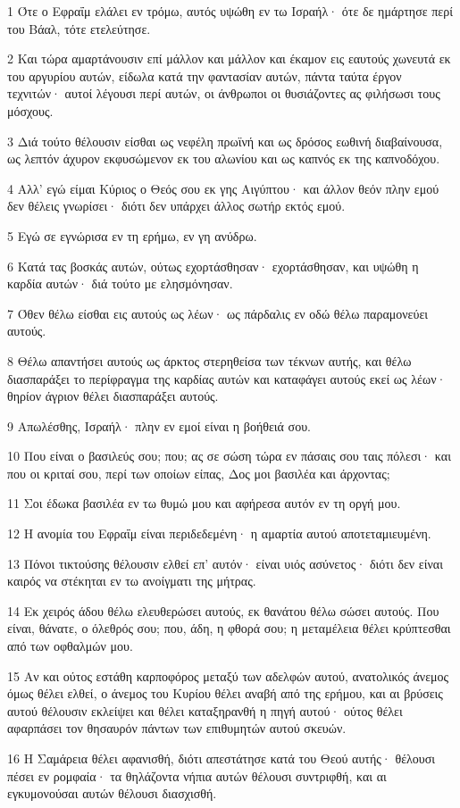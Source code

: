 \par 1 Ότε ο Εφραΐμ ελάλει εν τρόμω, αυτός υψώθη εν τω Ισραήλ· ότε δε ημάρτησε περί του Βάαλ, τότε ετελεύτησε.
\par 2 Και τώρα αμαρτάνουσιν επί μάλλον και μάλλον και έκαμον εις εαυτούς χωνευτά εκ του αργυρίου αυτών, είδωλα κατά την φαντασίαν αυτών, πάντα ταύτα έργον τεχνιτών· αυτοί λέγουσι περί αυτών, οι άνθρωποι οι θυσιάζοντες ας φιλήσωσι τους μόσχους.
\par 3 Διά τούτο θέλουσιν είσθαι ως νεφέλη πρωϊνή και ως δρόσος εωθινή διαβαίνουσα, ως λεπτόν άχυρον εκφυσώμενον εκ του αλωνίου και ως καπνός εκ της καπνοδόχου.
\par 4 Αλλ' εγώ είμαι Κύριος ο Θεός σου εκ γης Αιγύπτου· και άλλον θεόν πλην εμού δεν θέλεις γνωρίσει· διότι δεν υπάρχει άλλος σωτήρ εκτός εμού.
\par 5 Εγώ σε εγνώρισα εν τη ερήμω, εν γη ανύδρω.
\par 6 Κατά τας βοσκάς αυτών, ούτως εχορτάσθησαν· εχορτάσθησαν, και υψώθη η καρδία αυτών· διά τούτο με ελησμόνησαν.
\par 7 Όθεν θέλω είσθαι εις αυτούς ως λέων· ως πάρδαλις εν οδώ θέλω παραμονεύει αυτούς.
\par 8 Θέλω απαντήσει αυτούς ως άρκτος στερηθείσα των τέκνων αυτής, και θέλω διασπαράξει το περίφραγμα της καρδίας αυτών και καταφάγει αυτούς εκεί ως λέων· θηρίον άγριον θέλει διασπαράξει αυτούς.
\par 9 Απωλέσθης, Ισραήλ· πλην εν εμοί είναι η βοήθειά σου.
\par 10 Που είναι ο βασιλεύς σου; που; ας σε σώση τώρα εν πάσαις σου ταις πόλεσι· και που οι κριταί σου, περί των οποίων είπας, Δος μοι βασιλέα και άρχοντας;
\par 11 Σοι έδωκα βασιλέα εν τω θυμώ μου και αφήρεσα αυτόν εν τη οργή μου.
\par 12 Η ανομία του Εφραΐμ είναι περιδεδεμένη· η αμαρτία αυτού αποτεταμιευμένη.
\par 13 Πόνοι τικτούσης θέλουσιν ελθεί επ' αυτόν· είναι υιός ασύνετος· διότι δεν είναι καιρός να στέκηται εν τω ανοίγματι της μήτρας.
\par 14 Εκ χειρός άδου θέλω ελευθερώσει αυτούς, εκ θανάτου θέλω σώσει αυτούς. Που είναι, θάνατε, ο όλεθρός σου; που, άδη, η φθορά σου; η μεταμέλεια θέλει κρύπτεσθαι από των οφθαλμών μου.
\par 15 Αν και ούτος εστάθη καρποφόρος μεταξύ των αδελφών αυτού, ανατολικός άνεμος όμως θέλει ελθεί, ο άνεμος του Κυρίου θέλει αναβή από της ερήμου, και αι βρύσεις αυτού θέλουσιν εκλείψει και θέλει καταξηρανθή η πηγή αυτού· ούτος θέλει αφαρπάσει τον θησαυρόν πάντων των επιθυμητών αυτού σκευών.
\par 16 Η Σαμάρεια θέλει αφανισθή, διότι απεστάτησε κατά του Θεού αυτής· θέλουσι πέσει εν ρομφαία· τα θηλάζοντα νήπια αυτών θέλουσι συντριφθή, και αι εγκυμονούσαι αυτών θέλουσι διασχισθή.

